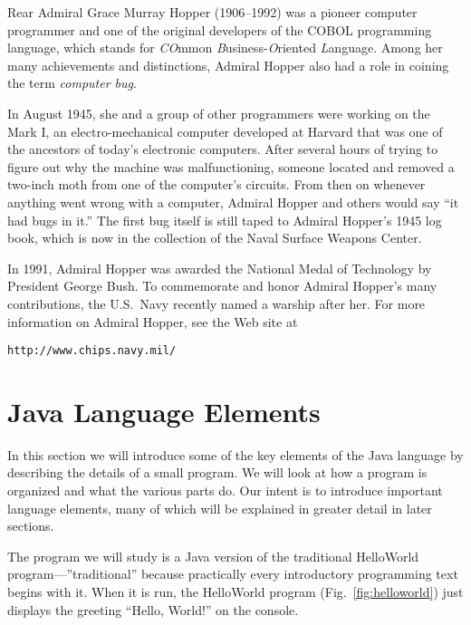 {\color{cyan}Rear Admiral} Grace Murray Hopper (1906--1992) was a
pioneer computer programmer and one of the original developers of the
COBOL programming language, which stands for {\it CO}mmon {\it
B}usiness-{\it O}riented {\it L}anguage.  Among her many achievements
and distinctions, Admiral Hopper also had a role in coining the term
{\it computer bug}.

In August 1945, she and a group of other programmers were working on
the Mark I, an electro-mechanical computer developed at Harvard that
was one of the ancestors of today's electronic computers.  After
several hours of trying to figure out why the machine was
malfunctioning, someone located and removed a two-inch moth from one
of the computer's circuits.  From then on whenever anything went wrong
with a computer, Admiral Hopper and others would say ``it had bugs in
it.''  The first bug itself is still taped to Admiral Hopper's 1945
log book, which is now in the collection of the Naval Surface Weapons
Center.

In 1991, Admiral Hopper was awarded the National Medal of Technology
by President George Bush.  To commemorate and honor Admiral Hopper's
many contributions, the U.S.~Navy recently named a warship after her.
For more information on Admiral Hopper, see the Web site at

\WWWleft
\begin{jjjlisting}
\begin{lstlisting}[commentstyle=\color{black}\small]
http://www.chips.navy.mil/
\end{lstlisting}
\end{jjjlisting}


\section{Java Language Elements}
\label{java-language-elements}

\noindent In this section we will introduce some of the key elements 
of the Java language by describing the details of a small program.  We
will look at how a program is organized and what the various parts
do. Our intent is to introduce important language elements, many of
which will be explained in greater detail in later sections.

The program we will study is a Java version of the traditional
HelloWorld program---''traditional'' because practically every
introductory programming text begins with it. When it is run, the
HelloWorld program (Fig.~\ref{fig:helloworld}) just displays the
greeting ``Hello, World!'' on the console.

